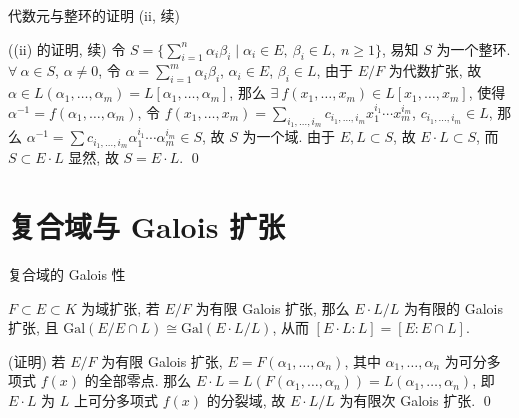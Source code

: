 
\begin{frame}{代数元与整环的证明 (ii, 续)}

\startproof[bg=yellow, fg=red]((ii) 的证明, 续)
令 $S = \{ \sum_{i=1}^{n} \alpha_i \beta_i \mid \alpha_i \in E,\
\beta_i \in L,\ n \geq 1 \}$, 易知 $S$ 为一个整环.
$\forall\ \alpha \in S$, $\alpha \neq 0$,
令 $\alpha = \sum_{i=1}^{m} \alpha_i \beta_i$, $\alpha_i \in E$, $\beta_i \in L$,
由于 $E/F$ 为代数扩张, 故 $\alpha \in L(\alpha_1, \dots, \alpha_m)
= L[\alpha_1, \dots, \alpha_m]$,
那么 $\exists\ f(x_1, \dots, x_m) \in L[x_1, \dots, x_m]$,
使得 $\alpha^{-1} = f(\alpha_1, \dots, \alpha_m)$,
令 $f(x_1, \dots, x_m) = \sum_{i_1, \dots, i_m} c_{i_1, \dots, i_m}
x_1^{i_1} \dotsm x_m^{i_m}$, $c_{i_1, \dots, i_m} \in L$,
那么 $\alpha^{-1} = \sum c_{i_1, \dots, i_m} \alpha_1^{i_1} \dotsm \alpha_m^{i_m}
\in S$, 故 $S$ 为一个域.
由于 $E, L \subset S$, 故 $E \cdot L \subset S$, 而 $S \subset E \cdot L$ 显然,
故 $S = E \cdot L$.
\qed

\end{frame}


\section[Galois]{复合域与 Galois 扩张}


\begin{frame}{复合域的 Galois 性}

\begin{lem}
$F \subset E \subset K$ 为域扩张, 若 $E/F$ 为有限 Galois 扩张,
那么 $E \cdot L/L$ 为有限的 Galois 扩张, 且
$\mathrm{Gal}(E/E \cap L) \cong \mathrm{Gal}(E \cdot L/L)$,
从而 $[E \cdot L:L] = [E:E \cap L]$.
\end{lem}

\startproof[bg=yellow, fg=red](证明)
若 $E/F$ 为有限 Galois 扩张, $E = F(\alpha_1, \dots, \alpha_n)$,
其中 $\alpha_1, \dots, \alpha_n$ 为可分多项式 $f(x)$ 的全部零点.
那么 $E \cdot L = L(F(\alpha_1, \dots, \alpha_n)) = L(\alpha_1, \dots, \alpha_n)$,
即 $E \cdot L$ 为 $L$ 上可分多项式 $f(x)$ 的分裂域,
故 $E \cdot L/L$ 为有限次 Galois 扩张.
\qed

\end{frame}


